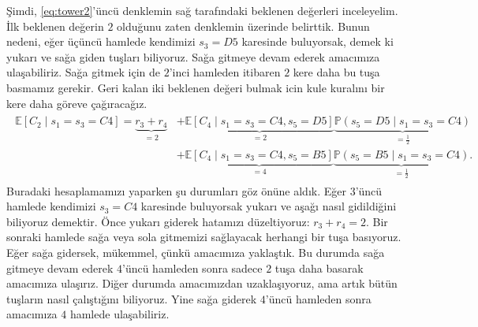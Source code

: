 \c{S}imdi, \eqref{eq:tower2}'\"{u}nc\"{u} denklemin sa\u{g} taraf{\i}ndaki
beklenen de\u{g}erleri inceleyelim. \.Ilk beklenen de\u{g}erin $2$ oldu\u{g}unu
zaten denklemin \"{u}zerinde belirttik. Bunun nedeni, e\u{g}er
\"u\c{c}\"{u}nc\"{u} hamlede kendimizi $s_3 = D5$ karesinde buluyorsak, demek ki
yukar{\i} ve sa\u{g}a giden tu\c{s}lar{\i} biliyoruz. Sa\u{g}a gitmeye devam
ederek amac{\i}m{\i}za ula\c{s}abiliriz. Sa\u{g}a gitmek i\c{c}in de $2$'inci
hamleden itibaren $2$ kere daha bu tu\c{s}a basmam{\i}z gerekir. Geri kalan iki
beklenen de\u{g}eri bulmak icin kule kural{\i}n{\i} bir kere daha g\"{o}reve
\c{c}a\u{g}{\i}raca\u{g}{\i}z.
%
\begin{align*}
    \begin{split}
    \mathbb{E}[C_2 \mid s_1=s_3=C4] = \underbrace{r_3+r_4}_{=2}
    &+ \underbrace{\mathbb{E}[C_4 \mid s_1=s_3=C4, s_5=D5]}_{=2} \underbrace{\mathbb{P}(s_5=D5 \mid s_1=s_3=C4)}_{=\frac{1}{2}} \\
    &+ \underbrace{\mathbb{E}[C_4 \mid s_1=s_3=C4, s_5=B5]}_{=4} \underbrace{\mathbb{P}(s_5=B5 \mid s_1=s_3=C4)}_{=\frac{1}{2}}.
    \end{split}
\end{align*}
%
Buradaki hesaplamam{\i}z{\i} yaparken \c{s}u durumlar{\i} g\"{o}z \"{o}n\"{u}ne
ald{\i}k. E\u{g}er $3$'\"{u}nc\"{u} hamlede kendimizi $s_3=C4$ karesinde
buluyorsak yukar{\i} ve a\c{s}a\u{g}{\i} nas{\i}l gidildi\u{g}ini biliyoruz
demektir. \"{O}nce yukar{\i} giderek hatam{\i}z{\i} d\"{u}zeltiyoruz: $r_3 + r_4
= 2$. Bir sonraki hamlede sa\u{g}a veya sola gitmemizi sa\u{g}layacak herhangi
bir tu\c{s}a bas{\i}yoruz. E\u{g}er sa\u{g}a gidersek, m\"{u}kemmel,
\c{c}\"{u}nk\"{u} amac{\i}m{\i}za yakla\c{s}t{\i}k. Bu durumda sa\u{g}a gitmeye
devam ederek $4$'\"{u}nc\"{u} hamleden sonra sadece $2$ tu\c{s}a daha basarak
amac{\i}m{\i}za ula\c{s}{\i}r{\i}z. Di\u{g}er durumda amac{\i}m{\i}zdan
uzakla\c{s}{\i}yoruz, ama art{\i}k b\"{u}t\"{u}n tu\c{s}lar{\i}n nas{\i}l
\c{c}al{\i}\c{s}t{\i}\u{g}{\i}n{\i} biliyoruz. Yine sa\u{g}a giderek
$4$'\"{u}nc\"{u} hamleden sonra amac{\i}m{\i}za $4$ hamlede ula\c{s}abiliriz.

